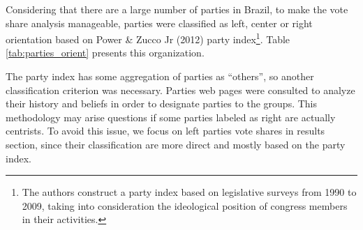 \documentclass[
  12pt,
]{article}
\begin{document}
Considering that there are a large number of parties in Brazil, to make
the vote share analysis manageable, parties were classified as left,
center or right orientation based on Power \& Zucco Jr (2012) party
index\footnote{The authors construct a party index based on legislative
  surveys from 1990 to 2009, taking into consideration the ideological
  position of congress members in their activities.}. Table
\ref{tab:parties_orient} presents this organization.

\begin{table}[!h]

\caption{\label{tab:parties_orient}Party classification according to orientation (left, center or right)}
\centering
{}
\end{table}

The party index has some aggregation of parties as ``others'', so
another classification criterion was necessary. Parties web pages were
consulted to analyze their history and beliefs in order to designate
parties to the groups. This methodology may arise questions if some
parties labeled as right are actually centrists. To avoid this issue, we
focus on left parties vote shares in results section, since their
classification are more direct and mostly based on the party index.
\end{document}
